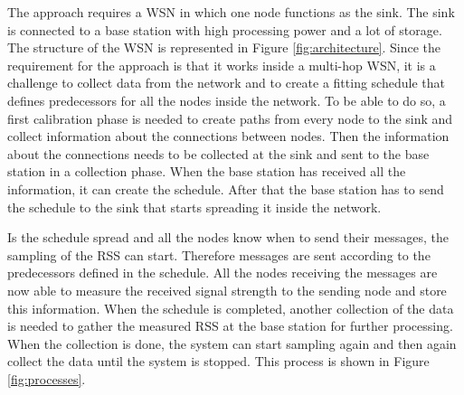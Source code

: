 The approach requires a WSN in which one node functions as the sink. The sink is connected to a base station with high processing power and a lot of storage. The structure of the WSN is represented in Figure \ref{fig:architecture}. Since the requirement for the approach is that it works inside a multi-hop WSN, it is a challenge to collect data from the network and to create a fitting schedule that defines predecessors for all the nodes inside the network. To be able to do so, a first calibration phase is needed to create paths from every node to the sink and collect information about the connections between nodes. Then the information about the connections needs to be collected at the sink and sent to the base station in a collection phase. When the base station has received all the information, it can create the schedule. After that the base station has to send the schedule to the sink that starts spreading it inside the network. 

Is the schedule spread and all the nodes know when to send their messages, the sampling of the RSS can start. Therefore messages are sent according to the predecessors defined in the schedule. All the nodes receiving the messages are now able to measure the received signal strength to the sending node and store this information. When the schedule is completed, another collection of the data is needed to gather the measured RSS at the base station for further processing. When the collection is done, the system can start sampling again and then again collect the data until the system is stopped. This process is shown in Figure \ref{fig:processes}.    

